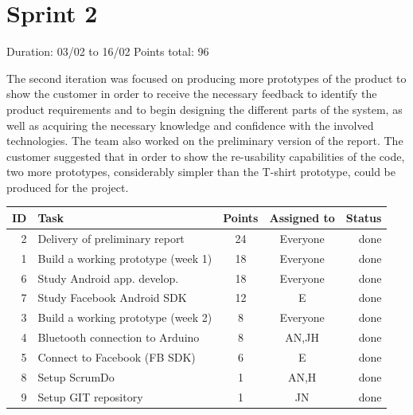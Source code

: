\newpage

\section{Sprint 2}

Duration: 03/02 to 16/02\newline
Points total: 96

The second iteration was focused on producing more prototypes of the product to
show the customer in order to receive the necessary feedback to identify
the product requirements and to begin designing the different parts of the
system, as well as acquiring the necessary knowledge and confidence with the
involved technologies. The team also worked on the preliminary version of the
report. The customer suggested that in order to show the re-usability
capabilities of the code, two more prototypes, considerably simpler than the
T-shirt prototype, could be produced for the project.

\begin{table}[ht!]
\begin{tabular}{ | r | l | c | c | r | }

\hline
\textbf{ID} & \textbf{Task} & \textbf{Points} & \textbf{Assigned to} &\textbf{Status} \\
\hline

 2 & Delivery of preliminary report				& 24 & Everyone		& done \\
\hline
 1 & Build a working prototype (week 1)			& 18 & Everyone		& done \\
\hline
 6 & Study Android app. develop.				& 18 & Everyone		& done \\
\hline
 7 & Study Facebook Android SDK					& 12 & E			& done \\
\hline
 3 & Build a working prototype (week 2)			& 8  & Everyone		& done \\
\hline
 4 & Bluetooth connection to Arduino			& 8  & AN,JH		& done \\
\hline
 5 & Connect to Facebook (FB SDK)				& 6  & E			& done \\
\hline
 8 & Setup ScrumDo								& 1  & AN,H			& done \\
\hline
 9 & Setup GIT repository						& 1  & JN			& done \\
\hline

\end{tabular}
\end{table}

